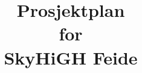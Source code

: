 \documentclass[12pt,a4paper]{article}
\begin{document}
\title{Prosjektplan \\ for \\ SkyHiGH Feide}
\maketitle
\end{document}
